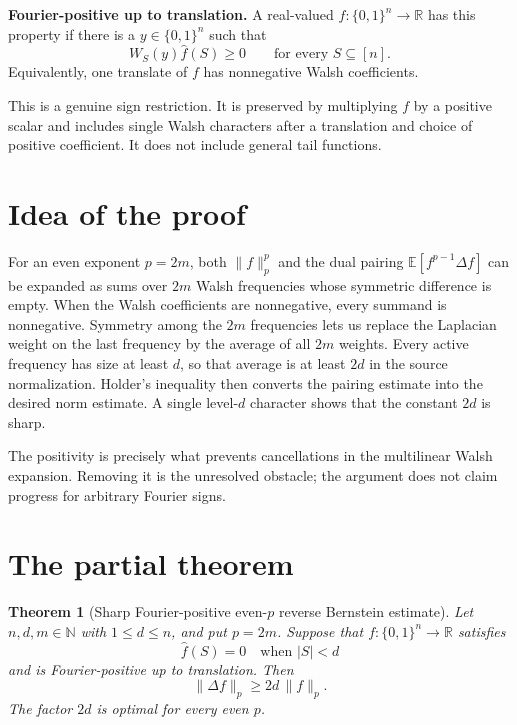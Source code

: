 \documentclass[11pt]{article}
\newtheorem{theorem}{Theorem}
\newcommand{\cube}{\{0,1\}^n}
\newcommand{\E}{\mathbb{E}}
\newcommand{\wh}{\widehat}
\begin{document}
\medskip
\noindent
\textbf{Fourier-positive up to translation.}
A real-valued $f:\cube\to\mathbb R$ has this property if there is a
$y\in\cube$ such that
\[
  W_S(y)\wh f(S)\ge0
  \qquad\text{for every }S\subseteq[n].
\]
Equivalently, one translate of $f$ has nonnegative Walsh coefficients.

This is a genuine sign restriction.  It is preserved by multiplying $f$ by a
positive scalar and includes single Walsh characters after a translation and
choice of positive coefficient.  It does not include general tail functions.

\section{Idea of the proof}

For an even exponent $p=2m$, both $\|f\|_p^p$ and the dual pairing
$\E[f^{p-1}\Delta f]$ can be expanded as sums over $2m$ Walsh frequencies whose
symmetric difference is empty.  When the Walsh coefficients are nonnegative,
every summand is nonnegative.  Symmetry among the $2m$ frequencies lets us replace
the Laplacian weight on the last frequency by the average of all $2m$ weights.
Every active frequency has size at least $d$, so that average is at least $2d$
in the source normalization.  Holder's inequality then converts the pairing
estimate into the desired norm estimate.  A single level-$d$ character shows
that the constant $2d$ is sharp.

The positivity is precisely what prevents cancellations in the multilinear
Walsh expansion.  Removing it is the unresolved obstacle; the argument does not
claim progress for arbitrary Fourier signs.

\section{The partial theorem}

\begin{theorem}[Sharp Fourier-positive even-$p$ reverse Bernstein estimate]
\label{thm:main}
Let $n,d,m\in\mathbb N$ with $1\le d\le n$, and put $p=2m$.
Suppose that $f:\cube\to\mathbb R$ satisfies
\[
  \wh f(S)=0\quad\text{when }|S|<d
\]
and is Fourier-positive up to translation.  Then
\begin{equation}\label{eq:main}
  \|\Delta f\|_{p}\ge 2d\,\|f\|_{p}.
\end{equation}
The factor $2d$ is optimal for every even $p$.
\end{theorem}
\end{document}
